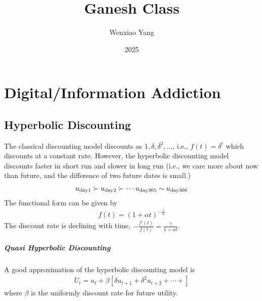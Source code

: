 \documentclass[11pt]{elegantbook}
\title{Ganesh Class}
\author{Wenxiao Yang}
\institute{Haas School of Business, University of California Berkeley}
\date{2025}
\begin{document}
\maketitle

\frontmatter
\tableofcontents

\mainmatter



\chapter{Digital/Information Addiction}
\section{Hyperbolic Discounting}
The classical discounting model discounts as $1,\delta,\delta^2,...$, i.e., $f(t)=\delta^t$ which discounts at a constant rate. However, the hyperbolic discounting model discounts faster in short run and slower in long run (i.e., we care more about now than future, and the difference of two future dates is small.)
\begin{equation}
    \begin{aligned}
        u_\textnormal{day1}\succ u_\textnormal{day2}\succ \cdots u_\textnormal{day365}\sim u_\textnormal{day366}
    \end{aligned}
    \nonumber
\end{equation}
The functional form can be given by
\begin{equation}
    \begin{aligned}
        f(t)=\left(1+\alpha t\right)^{-\frac{\gamma}{\alpha}}
    \end{aligned}
    \nonumber
\end{equation}
The discount rate is declining with time, $-\frac{f'(t)}{f(t)}=\frac{\gamma}{1+\alpha t}$.

\paragraph*{Quasi Hyperbolic Discounting}
A good approximation of the hyperbolic discounting model is
\begin{equation}
    \begin{aligned}
        U_t=u_t+\beta\left[\delta u_{t+1}+\delta^2 u_{t+2}+\cdots+\right]
    \end{aligned}
    \nonumber
\end{equation}
where $\beta$ is the uniformly discount rate for future utility.
\end{document}
